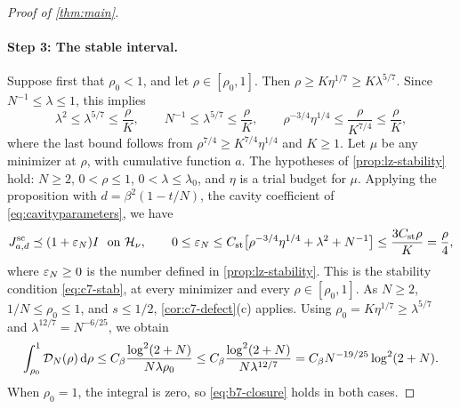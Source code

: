 \begin{proof}[Proof of \cref{thm:main}]
\paragraph{Step 3: The stable interval.} Suppose first that $\rho_0<1$,
and let
$\rho\in[\rho_0,1]$. Then $\rho\ge K\eta^{1/7}\ge K\lambda^{5/7}$. Since
$N^{-1}\le\lambda\le1$, this implies
\[
 \lambda^2\le\lambda^{5/7}\le\frac\rho K,\qquad
 N^{-1}\le\lambda^{5/7}\le\frac\rho K,\qquad
 \rho^{-3/4}\eta^{1/4}\le\frac\rho{K^{7/4}}\le\frac\rho K,
\]
where the last bound follows from $\rho^{7/4}\ge K^{7/4}\eta^{1/4}$ and
$K\ge1$. Let $\mu$ be any minimizer at $\rho$, with cumulative function
$a$. The hypotheses of \cref{prop:lz-stability} hold: $N\ge2$,
$0<\rho\le1$, $0<\lambda\le\lambda_0$, and $\eta$ is a trial budget for
$\mu$. Applying the proposition with $d=\beta^2(1-t/N)$, the cavity
coefficient of \eqref{eq:cavityparameters}, we have
\[
 J^{\mathrm{sc}}_{a,d}\preceq(1+\varepsilon_N)I\ \text{ on }\mathcal H_\nu,\qquad
 0\le\varepsilon_N\le C_{\rm st}\bigl[\rho^{-3/4}\eta^{1/4}+\lambda^2+N^{-1}\bigr]
 \le\frac{3C_{\rm st}\rho}K=\frac\rho4,
\]
where $\varepsilon_N\ge0$ is the number defined in \cref{prop:lz-stability}.
This is the stability condition \eqref{eq:c7-stab}, at every minimizer
and every $\rho\in[\rho_0,1]$. As $N\ge2$, $1/N\le\rho_0\le1$, and
$s\le1/2$, \cref{cor:c7-defect}(c) applies. Using
$\rho_0=K\eta^{1/7}\ge\lambda^{5/7}$ and
$\lambda^{12/7}=N^{-6/25}$, we obtain
\begin{equation}\label{eq:b7-closure}
 \int_{\rho_0}^1\mathcal D_N(\rho)\,\mathrm d\rho
 \le C_\beta\frac{\log^2(2+N)}{N\lambda\rho_0}
 \le C_\beta\frac{\log^2(2+N)}{N\lambda^{12/7}}
 =C_\beta N^{-19/25}\log^2(2+N).
\end{equation}
When $\rho_0=1$, the integral is zero, so \eqref{eq:b7-closure} holds in
both cases.


\end{proof}
